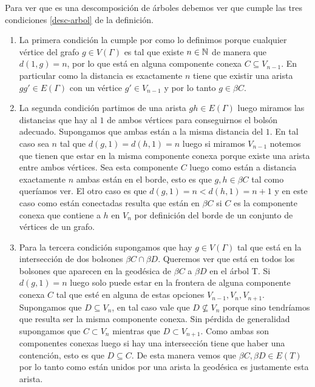 \documentclass[tesis.tex]{subfiles}
\begin{document}
\begin{ej}
	Para ver que es una descomposición de árboles debemos ver que cumple las tres condiciones \ref{desc-arbol} de la definición. 
	\begin{enumerate}
		\item La primera condición la cumple por como lo definimos porque cualquier vértice del grafo $g \in V(\Gamma)$ 
		es tal que existe $n \in \mathbb N$ de manera que $d(1,g)=n$, por lo que está en alguna componente conexa $C \subseteq V_{n-1}$. 
		En particular como la distancia es exactamente $n$ tiene que existir una arista $gg' \in E(\Gamma)$ con un vértice $g' \in V_{n-1}$ y por lo tanto $g \in \beta C$.
		
		\item La segunda condición partimos de una arista $gh \in E(\Gamma)$ luego miramos las distancias que hay al $1$ de ambos vértices para conseguirnos el bolsón adecuado. 
		Supongamos que ambas están a la misma distancia del $1$. En tal caso sea $n$ tal que $d(g,1)=d(h,1)=n$ luego si miramos $V_{n-1}$ notemos que tienen que estar en la misma componente conexa porque existe una arista entre ambos vértices. Sea esta componente $C$ luego como están a distancia exactamente $n$ ambas están en el borde, esto es que $g,h \in \beta C$ tal como queríamos ver. 
		El otro caso es que $d(g,1)=n < d(h,1)=n+1$ y en este caso como están conectadas resulta que están en $\beta C$ si $C$ es la componente conexa que contiene a $h$ en $V_n$ por definición del borde de un conjunto de vértices de un grafo.
		
		\item Para la tercera condición supongamos que hay $g \in V(\Gamma)$ tal que está en la intersección de dos bolsones $\beta C \cap \beta D$. 
		Queremos ver que está en todos los bolsones que aparecen en la geodésica de $\beta C$ a $\beta D$ en el árbol T. 
		Si $d(g,1) = n$ luego solo puede estar en la frontera de alguna componente conexa $C$ tal que esté en alguna de estas opciones  $V_{n-1}, V_{n},  V_{n+1}$. 
		Supongamos que $D \subseteq V_{n}$, en tal caso vale que $D \nsubseteq V_{n}$ porque sino tendríamos que resulta ser la misma componente conexa. 
		Sin pérdida de generalidad supongamos que $C \subset V_n$ mientras que $D \subset V_{n+1}$. 
		Como ambas son componentes conexas luego si hay una intersección tiene que haber una contención, esto es que $D \subseteq C$. 
		De esta manera vemos que $\beta C, \beta D \in E(T)$ por lo tanto como están unidos por una arista la geodésica es justamente esta arista.
		
	\end{enumerate}
\end{ej}
\end{document}

